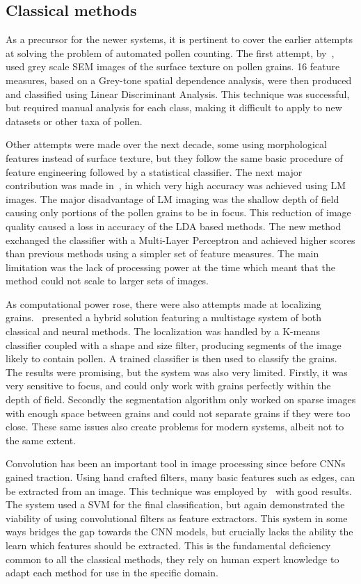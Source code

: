 \subsection{Classical methods}
As a precursor for the newer systems, it is pertinent to cover the earlier attempts at solving the problem of automated pollen counting.
The first attempt, by~\cite{langford_computerized_1990}, used grey scale SEM images of the surface texture on pollen grains.
16 feature measures, based on a Grey-tone spatial dependence analysis, were then produced and classified using Linear Discriminant Analysis.
This technique was successful, but required manual analysis for each class, making it difficult to apply to new datasets or other taxa of pollen.

Other attempts were made over the next decade, some using morphological features instead of surface texture, but they follow the same basic procedure of feature engineering followed by a statistical classifier.
The next major contribution was made in~\cite{li_pollen_1999}, in which very high accuracy was achieved using LM images.
The major disadvantage of LM imaging was the shallow depth of field causing only portions of the pollen grains to be in focus.
This reduction of image quality caused a loss in accuracy of the LDA based methods.
The new method exchanged the classifier with a Multi-Layer Perceptron and achieved higher scores than previous methods using a simpler set of feature measures.
The main limitation was the lack of processing power at the time which meant that the method could not scale to larger sets of images.

As computational power rose, there were also attempts made at localizing grains.\ \cite{france_new_2000} presented a hybrid solution featuring a multistage system of both classical and neural methods.
The localization was handled by a K-means classifier coupled with a shape and size filter, producing segments of the image likely to contain pollen.
A trained classifier is then used to classify the grains.
The results were promising, but the system was also very limited.
Firstly, it was very sensitive to focus, and could only work with grains perfectly within the depth of field.
Secondly the segmentation algorithm only worked on sparse images with enough space between grains and could not separate grains if they were too close.
These same issues also create problems for modern systems, albeit not to the same extent.

Convolution has been an important tool in image processing since before CNNs gained traction.
Using hand crafted filters, many basic features such as edges, can be extracted from an image.
This technique was employed by\ \cite{DaoodICPR16b} with good results.
The system used a SVM for the final classification, but again demonstrated the viability of using convolutional filters as feature extractors.
This system in some ways bridges the gap towards the CNN models, but crucially lacks the ability the learn which features should be extracted.
This is the fundamental deficiency common to all the classical methods, they rely on human expert knowledge to adapt each method for use in the specific domain.

